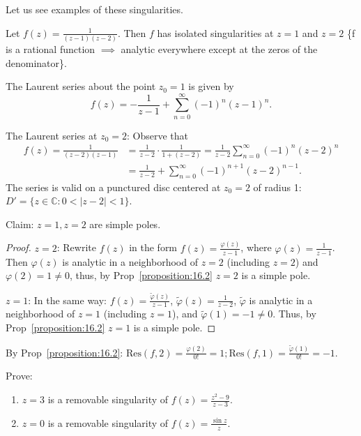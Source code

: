 Let us see examples of these singularities.

\begin{example}\label{example:18.1} Let $f(z) = \frac{1}{(z-1)(z-2)}$. Then $f$ has isolated singularities at $z = 1$ and $z = 2$ \{f is a rational function $\implies$ analytic everywhere except at the 
    zeros of the denominator\}.

\end{example}
\checkthis{} The Laurent series about the point $z_0 = 1$ is given by \[ f(z) = -\frac{1}{z-1} + \sum_{n=0}^{\infty} (-1)^n (z-1)^n.\]

The Laurent series at $z_0 = 2$: Observe that
\begin{align*} f(z) = \frac{1}{(z-2)(z-1)} & = \frac{1}{z-2} \cdot \frac{1}{1 + (z-2)} = \frac{1}{z-2} \sum_{n=0}^{\infty} (-1)^n (z-2)^n \\ 
    & = \frac{1}{z-2} + \sum_{n=0}^{\infty} (-1)^{n+1} (z-2)^{n-1}.
\end{align*}
The series is valid on a punctured disc centered at $z_0 = 2$ of radius 1: $D' = \{z \in \mathbb{C}: 0 < |z-2| < 1\}$.
\begin{claim}
    Claim: $z = 1, z = 2$ are simple poles.
\end{claim}
\begin{proof}
 $z = 2$: Rewrite $f(z)$ in the form $f(z) = \frac{\varphi(z)}{z-1}$, where $\varphi(z) = \frac{1}{z-1}$. Then $\varphi(z)$ is analytic in a 
 neighborhood of $z = 2$ (including $z = 2$) and $\varphi(2) = 1 \neq 0$, thus, by Prop~\ref{proposition:16.2} $z = 2$ is a simple pole.

$z = 1$: In the same way: $f(z) = \frac{\tilde{\varphi}(z)}{z-1}$, $\tilde{\varphi}(z) = \frac{1}{z-2}$, $\tilde{\varphi}$ is analytic in a 
neighborhood of $z = 1$ (including $z = 1$), and $\tilde{\varphi}(1) = -1 \neq 0$. Thus, by Prop~\ref{proposition:16.2} $z = 1$ is a simple pole.
\end{proof}
By Prop~\ref{proposition:16.2}: $\text{Res}(f, 2) = \frac{\varphi(2)}{0!} = 1; \text{Res}(f, 1) = \frac{\tilde{\varphi}(1)}{0!} = -1$.

\begin{example}\label{example:18.2} Prove:
    \begin{enumerate}
        \item $z = 3$ is a removable singularity of $f(z) = \frac{z^2 - 9}{z - 3}$.
        \item $z = 0$ is a removable singularity of $f(z) = \frac{\sin z}{z}$.
    \end{enumerate}

\end{example}


